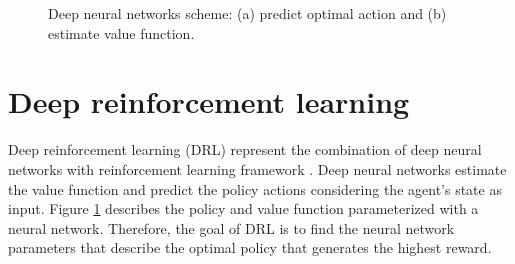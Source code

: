 \begin{figure}[t]
	\centering
	\hfill
	\caption{Deep neural networks scheme: (a) predict optimal action and (b) estimate value function.}
	\label{fig:rl_cnn}
\end{figure}

\section{Deep reinforcement learning}
Deep reinforcement learning (DRL) represent the combination of deep neural networks with reinforcement learning framework \cite{li2017deep}. Deep neural networks estimate the value function and predict the policy actions considering the agent's state as input. Figure \ref{fig:rl_cnn} describes the policy and value function parameterized with a neural network. Therefore, the goal of DRL is to find the neural network parameters that describe the optimal policy that generates the highest reward.

